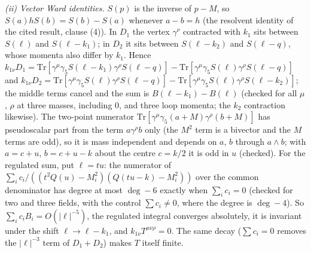 \emph{(ii) Vector Ward identities.} $S(p)$ is the inverse of $p - M$, so $S(a)hS(b) = S(b) - S(a)$ whenever $a - b = h$ (the resolvent identity of the cited result, clause (4)). In $D_{1}$ the vertex $\gamma^{\nu}$ contracted with $k_{1}$ sits between $S(\ell)$ and $S(\ell - k_{1})$; in $D_{2}$ it sits between $S(\ell - k_{2})$ and $S(\ell - q)$, whose momenta also differ by $k_{1}$. Hence $k_{1\nu}D_{1} = \mathrm{Tr}[\gamma^{\mu}\gamma_{5}S(\ell - k_{1})\gamma^{\rho}S(\ell - q)] - \mathrm{Tr}[\gamma^{\mu}\gamma_{5}S(\ell)\gamma^{\rho}S(\ell - q)]$ and $k_{1\nu}D_{2} = \mathrm{Tr}[\gamma^{\mu}\gamma_{5}S(\ell)\gamma^{\rho}S(\ell - q)] - \mathrm{Tr}[\gamma^{\mu}\gamma_{5}S(\ell)\gamma^{\rho}S(\ell - k_{2})]$; the middle terms cancel and the sum is $B(\ell - k_{1}) - B(\ell)$ (checked for all $\mu$, $\rho$ at three masses, including $0$, and three loop momenta; the $k_{2}$ contraction likewise). The two-point numerator $\mathrm{Tr}[\gamma^{\mu}\gamma_{5}(a + M)\gamma^{\rho}(b + M)]$ has pseudoscalar part from the term $a\gamma^{\rho}b$ only (the $M^{2}$ term is a bivector and the $M$ terms are odd), so it is mass independent and depends on $a$, $b$ through $a\wedge b$; with $a = c + u$, $b = c + u - k$ about the centre $c = k/2$ it is odd in $u$ (checked). For the regulated sum, put $\ell = tu$: the numerator of $\sum_{i}c_{i}/((t^{2}Q(u) - M_{i}^{2})(Q(tu - k) - M_{i}^{2}))$ over the common denominator has degree at most $\deg - 6$ exactly when $\sum_{i}c_{i} = 0$ (checked for two and three fields, with the control $\sum c_{i} \neq 0$, where the degree is $\deg - 4$). So $\sum_{i}c_{i}B_{i} = O(|\ell|^{-5})$, the regulated integral converges absolutely, it is invariant under the shift $\ell \to \ell - k_{1}$, and $k_{1\nu}T^{\mu\nu\rho} = 0$. The same decay ($\sum c_{i} = 0$ removes the $|\ell|^{-3}$ term of $D_{1} + D_{2}$) makes $T$ itself finite.


